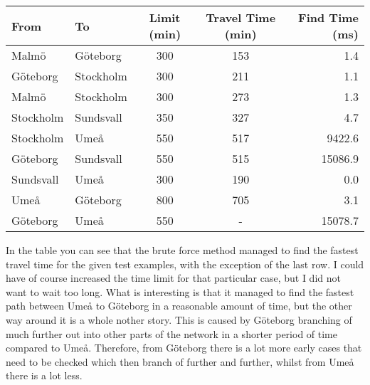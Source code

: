 \documentclass[a4paper, 11pt]{article}
\begin{document}
	\begin{adjustbox}{center}
		\begin{tabular}{|l|l|c|c|r|}
			\hline
			\textbf{From} & \textbf{To} & \textbf{Limit (min)} & \textbf{Travel Time (min)} & \textbf{Find Time (ms)} \\
			\hline
			       Malmö &  Göteborg & 300 & 153 &     1.4 \\
			    Göteborg & Stockholm & 300 & 211 &     1.1 \\
			       Malmö & Stockholm & 300 & 273 &     1.3 \\
			   Stockholm & Sundsvall & 350 & 327 &     4.7 \\
			   Stockholm &      Umeå & 550 & 517 &  9422.6 \\
			    Göteborg & Sundsvall & 550 & 515 & 15086.9 \\
			   Sundsvall &      Umeå & 300 & 190 &     0.0 \\
			        Umeå &  Göteborg & 800 & 705 &     3.1 \\
			    Göteborg &      Umeå & 550 &  -  & 15078.7 \\
			\hline
		\end{tabular}
	\end{adjustbox}
	\par
	In the table you can see that the brute force method managed to find the fastest travel time for the given test examples,
	with the exception of the last row.
	I could have of course increased the time limit for that particular case, but I did not want to wait too long.
	What is interesting is that it managed to find the fastest path between Umeå to Göteborg in a reasonable amount of time,
	but the other way around it is a whole nother story.
	This is caused by Göteborg branching of much further out into other parts of the network in a shorter period of time compared to Umeå.
	Therefore, from Göteborg there is a lot more early cases that need to be checked which then branch of further and further,
	whilst from Umeå there is a lot less.
\end{document}
